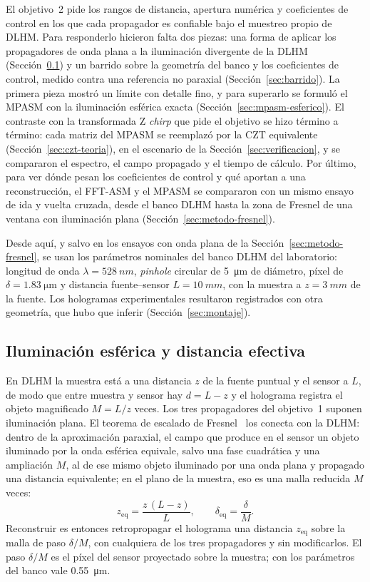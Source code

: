 El objetivo~2 pide los rangos de distancia, apertura numérica y coeficientes
de control en los que cada propagador es confiable bajo el muestreo propio de
DLHM. Para responderlo hicieron falta dos piezas: una forma de aplicar los
propagadores de onda plana a la iluminación divergente de la DLHM
(Sección~\ref{sec:esferica}) y un barrido sobre la geometría del banco y los
coeficientes de control, medido contra una referencia no paraxial
(Sección~\ref{sec:barrido}). La primera pieza mostró un límite con detalle
fino, y para superarlo se formuló el MPASM con la iluminación
esférica exacta (Sección~\ref{sec:mpasm-esferico}). El contraste con la
transformada Z \emph{chirp} que pide el objetivo se hizo término a término:
cada matriz del MPASM se reemplazó por la CZT equivalente
(Sección~\ref{sec:czt-teoria}), en el escenario de la
Sección~\ref{sec:verificacion}, y se compararon el espectro, el campo
propagado y el tiempo de cálculo. Por último, para ver dónde pesan
los coeficientes de control y qué aportan a una reconstrucción, el FFT-ASM y
el MPASM se compararon con un mismo ensayo de ida y vuelta cruzada, desde el
banco DLHM hasta la zona de Fresnel de una ventana con iluminación plana
(Sección~\ref{sec:metodo-fresnel}).

Desde aquí, y salvo en los ensayos con onda plana de la
Sección~\ref{sec:metodo-fresnel}, se usan los parámetros nominales del banco
DLHM del laboratorio: longitud
de onda $\lambda = \SI{528}{nm}$, \emph{pinhole} circular de
\SI{5}{\micro\metre} de diámetro, píxel de $\delta = \SI{1.83}{\micro\metre}$
y distancia fuente--sensor $L = \SI{10}{mm}$, con la muestra a
$z = \SI{3}{mm}$ de la fuente. Los hologramas experimentales resultaron
registrados con otra geometría, que hubo que inferir
(Sección~\ref{sec:montaje}).

\subsection{Iluminación esférica y distancia efectiva}
\label{sec:esferica}

En DLHM la muestra está a una distancia $z$ de la fuente puntual y el sensor a
$L$, de modo que entre muestra y sensor hay $d = L - z$ y el holograma
registra el objeto magnificado $M = L/z$ veces. Los tres propagadores del
objetivo~1 suponen iluminación plana. El teorema de escalado de
Fresnel~\cite{latychevskaia2015} los conecta con la DLHM: dentro de la
aproximación paraxial, el campo que produce en el sensor un objeto iluminado
por la onda esférica equivale, salvo una fase cuadrática y una ampliación $M$,
al de ese mismo objeto iluminado por una onda plana y propagado una distancia
equivalente; en el plano de la muestra, eso es una malla reducida $M$ veces:
\begin{equation}
  z_\mathrm{eq} = \frac{z\,(L - z)}{L}, \qquad \delta_\mathrm{eq} = \frac{\delta}{M}.
  \label{eq:escalado}
\end{equation}
Reconstruir es entonces retropropagar el holograma una distancia
$z_\mathrm{eq}$ sobre la malla de paso $\delta/M$, con cualquiera de los tres
propagadores y sin modificarlos. El paso $\delta/M$ es el píxel del sensor
proyectado sobre la muestra; con los parámetros del banco vale
\SI{0.55}{\micro\metre}.

